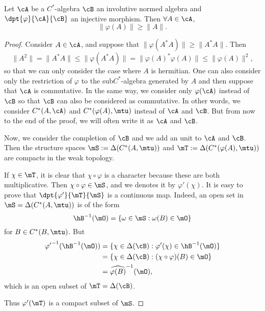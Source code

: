 \begin{proposition} \label{prop:vp_geq}
Let $\cA$ be a $C^{*}$-algebra $\cB$ an involutive normed algebra and $\dpt{\varphi}{\cA}{\cB}$ an injective morphism. Then $\forall A\in\cA$,
\begin{equation}
   \|\varphi(A)\|\geq\|A\|.
\end{equation}
\end{proposition}

\begin{proof}
Consider $A\in\cA$, and suppose that $\|\varphi(A^*A)\|\geq\|A^*A\|$. Then
\[
\|A^2\|=\|A^*A\|\leq\|\varphi(A^*A)\|=\|\varphi(A)^*\varphi(A)\|\leq\|\varphi(A)\|^2,
\]
so that we can only consider the case where $A$ is hermitian. One can also consider only the restriction of $\varphi$ to the sub$C^{*}$-algebra generated by $A$ and then suppose that $\cA$ is commutative. In the same way, we consider only $\varphi(\cA)$ instead of $\cB$ so that $\cB$ can also be considered as commutative. In other words, we consider $C^*(A,\cA)$ and $C^*(\varphi(A),\mtu)$ instead of $\cA$ and $\cB$. But from now to the end of the proof, we will often write it as $\cA$ and $\cB$.

Now, we consider the completion of $\cB$ and we add an unit to $\cA$ and $\cB$. Then the structure spaces $\mS:=\Delta(C^*(A,\mtu))$ and $\mT:=\Delta(C^*(\varphi(A),\mtu))$ are compacts in the weak topology.

If $\chi\in\mT$, it is clear that $\chi\circ\varphi$ is a character because these are both multiplicative. Then $\chi\circ\varphi\in\mS$, and we denotes it by $\varphi'(\chi)$. It is easy to prove that $\dpt{\varphi'}{\mT}{\mS}$ is a continuous map. Indeed, an open set in $\mS=\Delta(C^*(A,\mtu))$ is of the form
\[
  \hB^{-1}(\mO)=\{ \omega\in\mS:\omega(B)\in\mO  \}
\]
 for $B\in C^*(B,\mtu)$. But
 \begin{equation}
\begin{split}
   {\varphi'}^{-1}(\hB^{-1}(\mO))&=\{ \chi\in\Delta(\cB):\varphi'(\chi)\in\hB^{-1}(\mO)  \}\\
                         &=\{ \chi\in\Delta(\cB): (\chi\circ\varphi)(B)\in\mO  \} \\
             &=\widehat{\varphi(B)}^{-1}(\mO),
\end{split}
\end{equation}
which is an open subset of $\mT=\Delta(\cB)$.
 
 Thus $\varphi'(\mT)$ is a compact subset of $\mS$.


\end{proof}
